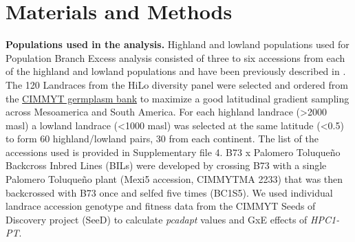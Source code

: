\documentclass[9pt,twocolumn,twoside,lineno]{BioRxiv}
\begin{document}


\section{Materials and Methods}
\label{sec:materials:methods}
\textbf{Populations used in the analysis.} 
Highland and lowland populations used for Population Branch Excess analysis consisted of three to six accessions from each of the highland and lowland populations and have been previously described in \cite{Wang2020-mp, Wang2017-bc}. 
The 120 Landraces from the HiLo diversity panel were selected and ordered from the \href{http://mgb.cimmyt.org/gringlobal/search.aspx}{CIMMYT germplasm bank} to maximize a good latitudinal gradient sampling across Mesoamerica and South America. 
For each highland landrace (>2000 masl) a lowland landrace (<1000 masl) was selected at the same latitude (<0.5\degree) to form 60 highland/lowland pairs, 30 from each continent. 
The list of the accessions used is provided in Supplementary file 4.   
B73 x Palomero Toluqueño Backcross Inbred Lines (BILs) were developed by crossing B73 with a single Palomero Toluqueño plant (Mexi5 accession, CIMMYTMA 2233) that was then backcrossed with B73 once and selfed five times (BC1S5).  
We used  individual landrace accession genotype and fitness data from the CIMMYT Seeds of Discovery project (SeeD) \cite{Gates2019-xu} to calculate \textit{pcadapt} \cite{Luu2017-ws} values and GxE effects of \textit{HPC1-PT}.
\end{document}
